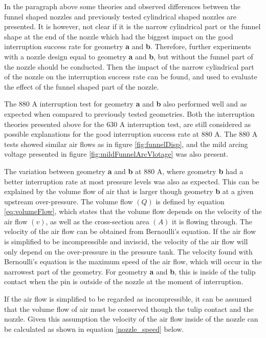\documentclass[10pt,b5paper,twoside]{article}
\begin{document}
In the paragraph above some theories and observed differences between the funnel shaped nozzles and previously tested cylindrical shaped nozzles are presented. It is however, not clear if it is the narrow cylindrical part or the funnel shape at the end of the nozzle which had the biggest impact on the good interruption success rate for geometry \textbf{a} and \textbf{b}. Therefore, further experiments with a nozzle design equal to geometry \textbf{a} and \textbf{b}, but without the funnel part of the nozzle should be conducted. Then the impact of the narrow cylindrical part of the nozzle on the interruption success rate can be found, and used to evaluate the effect of the funnel shaped part of the nozzle. 

The 880 A interruption test for geometry \textbf{a} and \textbf{b} also performed well and as expected when compared to previously tested geometries. Both the interruption theories presented above for the 630 A interruption test, are still considered as possible explanations for the good interruption success rate at 880 A. The 880 A tests showed similar air flows as in figure \ref{fig:funnelDisp}, and the mild arcing voltage presented in figure \ref{fig:mildFunnelArcVlotage} was also present.

The variation between geometry \textbf{a} and \textbf{b} at 880 A, where geometry \textbf{b} had a better interruption rate at most pressure levels was also as expected. This can be explained by the volume flow of air that is larger though geometry \textbf{b} at a given upstream over-pressure. The volume flow $(Q)$ is defined by equation \eqref{eq:volumeFlow}, which states that the volume flow depends on the velocity of the air flow $(v)$, as well as the cross-section area $(A)$ it is flowing through. The velocity of the air flow can be obtained from Bernoulli's equation. If the air flow is simplified to be incompressible and inviscid, the velocity of the air flow will only depend on the over-pressure in the pressure tank. The velocity found with Bernoulli's equation is the maximum speed of the air flow, which will occur in the narrowest part of the geometry. For geometry \textbf{a} and \textbf{b}, this is inside of the tulip contact when the pin is outside of the nozzle at the moment of interruption.

If the air flow is simplified to be regarded as incompressible, it can be assumed that the volume flow of air must be conserved though the tulip contact and the nozzle. Given this assumption the velocity of the air flow inside of the nozzle can be calculated as shown in equation \eqref{nozzle_speed} below.
\end{document}

